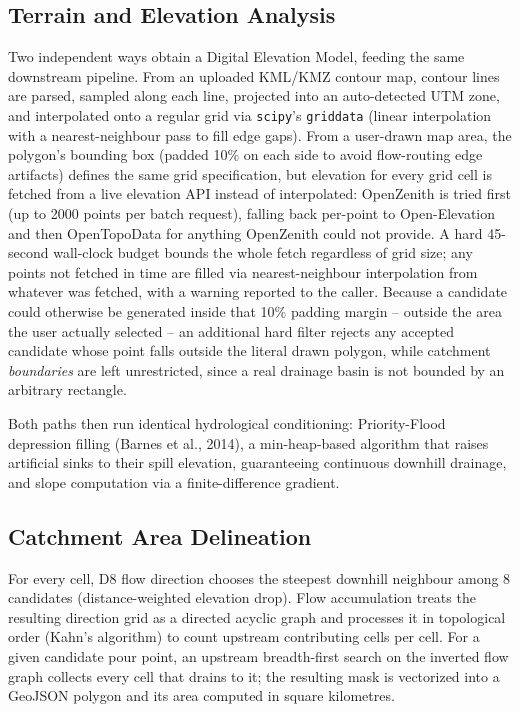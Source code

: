 \documentclass[manuscript,screen]{acmart}
\begin{document}
\subsection{Terrain and Elevation Analysis}
Two independent ways obtain a Digital Elevation Model, feeding the same
downstream pipeline. From an uploaded KML/KMZ contour map, contour lines
are parsed, sampled along each line, projected into an auto-detected UTM
zone, and interpolated onto a regular grid via \texttt{scipy}'s
\texttt{griddata} (linear interpolation with a nearest-neighbour pass to
fill edge gaps). From a user-drawn map area, the polygon's bounding box
(padded 10\% on each side to avoid flow-routing edge artifacts) defines
the same grid specification, but elevation for every grid cell is fetched
from a live elevation API instead of interpolated: OpenZenith is tried
first (up to 2000 points per batch request), falling back per-point to
Open-Elevation and then OpenTopoData for anything OpenZenith could not
provide. A hard 45-second wall-clock budget bounds the whole fetch
regardless of grid size; any points not fetched in time are filled via
nearest-neighbour interpolation from whatever was fetched, with a warning
reported to the caller. Because a candidate could otherwise be generated
inside that 10\% padding margin -- outside the area the user actually
selected -- an additional hard filter rejects any accepted candidate whose
point falls outside the literal drawn polygon, while catchment
\emph{boundaries} are left unrestricted, since a real drainage basin is
not bounded by an arbitrary rectangle.

Both paths then run identical hydrological conditioning: Priority-Flood
depression filling (Barnes et al., 2014), a min-heap-based algorithm that
raises artificial sinks to their spill elevation, guaranteeing continuous
downhill drainage, and slope computation via a finite-difference gradient.

\subsection{Catchment Area Delineation}
For every cell, D8 flow direction chooses the steepest downhill neighbour
among 8 candidates (distance-weighted elevation drop). Flow accumulation
treats the resulting direction grid as a directed acyclic graph and
processes it in topological order (Kahn's algorithm) to count upstream
contributing cells per cell. For a given candidate pour point, an upstream
breadth-first search on the inverted flow graph collects every cell that
drains to it; the resulting mask is vectorized into a GeoJSON polygon and
its area computed in square kilometres.
\end{document}
